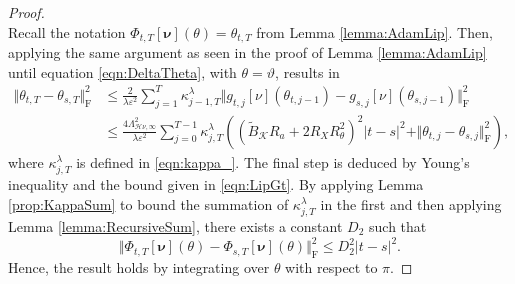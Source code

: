 \documentclass{article}
\begin{document}
\begin{appendices}
\begin{proof}
\begin{equation}
\end{equation}
Recall the notation $\Phi_{t,T}[\bm\nu](\theta)=\theta_{t,T}$ from Lemma \ref{lemma:AdamLip}. Then, applying the same argument as seen in the proof  of Lemma \ref{lemma:AdamLip} until equation \eqref{eqn:DeltaTheta}, with $\theta=\vartheta$, results in
    \begin{align*}
            \Vert\theta_{t,T}-\theta_{s,T}\Vert^2_\mathrm{F} &\le \frac{2}{\lambda\varepsilon^2}\sum_{j=1}^T \kappa^\lambda_{j-1,T} \Vert g_{t,j}[\nu](\theta_{t,j-1})-g_{s,j}[\nu](\theta_{s,j-1})\Vert^2_\mathrm{F}\\
 &\le \frac{4\Lambda_{\mathcal H\nu,\infty}^2}{\lambda\varepsilon^2}\sum_{j=0}^{T-1}\kappa^\lambda_{j,T} \left( (\tilde{B}_\mathcal{K} R_a+2R_XR_\theta^2)^2|t-s|^2+\Vert \theta_{t,j}-\theta_{s,j}\Vert^2_\mathrm{F}\right),
    \end{align*}
where $\kappa^\lambda_{j,T}$ is defined in \eqref{eqn:kappa_}.
The final step is deduced by Young's inequality and the bound given in \eqref{eqn:LipGt}. By applying Lemma \ref{prop:KappaSum} to bound the summation of $\kappa^\lambda_{j,T}$ in the first and then applying Lemma \ref{lemma:RecursiveSum}, there exists a constant $D_2$ such that
\[
\Vert \Phi_{t,T}[\bm\nu](\theta)-\Phi_{s,T}[\bm\nu](\theta)\Vert^2_\mathrm{F} \le D^2_2|t-s|^{2}.
\]
Hence, the result holds by integrating over $\theta$ with respect to $\pi$.
\end{proof}


\end{appendices}
\end{document}
